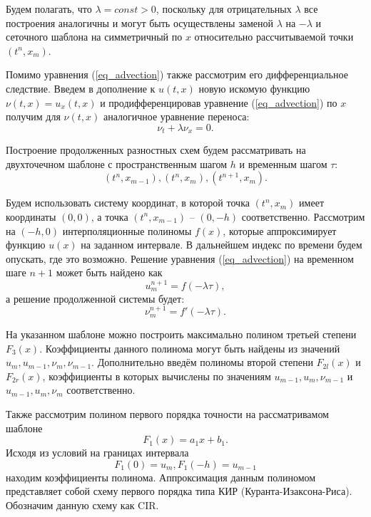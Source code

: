 \documentclass[11pt]{article}
\begin{document}
Будем полагать, что $\lambda = const > 0$,
поскольку для отрицательных $\lambda$ все построения аналогичны и могут быть осуществлены заменой $\lambda$ на $-\lambda$
и сеточного шаблона на симметричный по $x$ относительно рассчитываемой точки $(t^n, x_m)$.

Помимо уравнения (\ref{eq_advection}) также рассмотрим его дифференциальное следствие.
Введем в дополнение к $u(t, x)$ новую искомую функцию $\nu(t, x) = u_x(t, x)$ и продифференцировав уравнение (\ref{eq_advection}) по $x$
получим для $\nu(t, x)$ аналогичное уравнение переноса:
\begin{equation}
\label{eq_advection_ext}
\nu_t + \lambda \nu_x = 0.
\end{equation}

Построение продолженных разностных схем будем рассматривать на двухточечном шаблоне с пространственным шагом $h$ и временным шагом $\tau$:
\begin{equation}
\label{eq_stencil_3}
(t^n, x_{m-1}), (t^n, x_m), (t^{n+1}, x_m).
\end{equation}

Будем использовать систему координат, в которой точка $(t^n, x_m)$ имеет координаты $(0, 0)$,
а точка $(t^n, x_{m-1})$ -- $(0, -h)$ соответственно.
Рассмотрим на $(-h, 0)$ интерполяционные полиномы $f(x)$,
которые аппроксимирует функцию $u(x)$ на заданном интервале.
В дальнейшем индекс по времени будем опускать, где это возможно.
Решение уравнения (\ref{eq_advection}) на временном шаге $n+1$ может быть найдено как
$$
u^{n+1}_m = f(-\lambda\tau),
$$
а решение продолженной системы будет:
$$
\nu^{n+1}_m = f'(-\lambda\tau).
$$

На указанном шаблоне можно построить максимально полином третьей степени $F_3(x)$.
Коэффициенты данного полинома могут быть найдены из значений $u_m, u_{m-1}, \nu_m, \nu_{m-1}$.
Дополнительно введём полиномы второй степени $F_{2l}(x)$ и $F_{2r}(x)$, коэффициенты в которых вычислены по значениям $u_{m-1}, u_m, \nu_{m-1}$ и $u_{m-1}, u_m, \nu_m$ соответственно.

Также рассмотрим полином первого порядка точности на рассматривамом шаблоне
\begin{equation}
\label{eq_poly_f1}
F_1(x) = a_1 x + b_1.
\end{equation}
Исходя из условий на границах интервала
$$
F_1(0) = u_m, F_1(-h) = u_{m-1}
$$
находим коэффициенты полинома.
Аппроксимация данным полиномом представляет собой схему первого порядка типа КИР (Куранта-Изаксона-Риса).
Обозначим данную схему как CIR.
\end{document}

